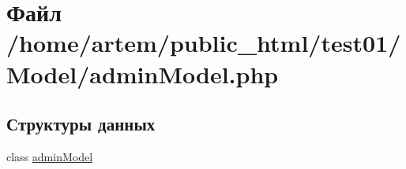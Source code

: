 \hypertarget{admin_model_8php}{\section{Файл /home/artem/public\-\_\-html/test01/\-Model/admin\-Model.php}
\label{admin_model_8php}
}
\subsection*{Структуры данных}
\begin{DoxyCompactItemize}
\item 
class \hyperlink{classadmin_model}{admin\-Model}
\end{DoxyCompactItemize}

